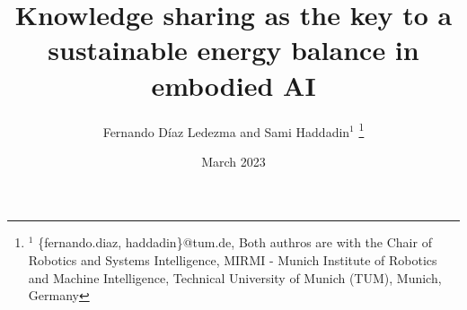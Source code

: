 \documentclass[a4, 10 pt, journal]{IEEEtran}
\begin{document}
\pagestyle{empty}
\title{Knowledge sharing as the key to a sustainable energy balance in embodied AI}

\author{Fernando D\'iaz Ledezma and Sami Haddadin$^{1}$%
\thanks{$^{1}$ {\small \{fernando.diaz, haddadin\}@tum.de}, 
Both authros are with the Chair of Robotics and Systems Intelligence, MIRMI - Munich Institute of Robotics and Machine Intelligence, Technical University of Munich (TUM), Munich, Germany}}
\date{March 2023}

\twocolumn[
  \begin{@twocolumnfalse}
    \maketitle
  \end{@twocolumnfalse}
]


% 
\end{document}
